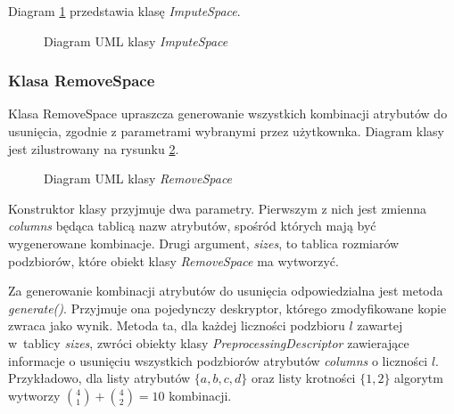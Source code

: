 \documentclass[../thesis.tex]{subfiles}
\begin{document}
Diagram \ref{proj:diagram_impute_space} przedstawia klasę \emph{ImputeSpace}.

\begin{figure}[h]
\centering
{}
\caption{Diagram UML klasy \emph{ImputeSpace}}
\label{proj:diagram_impute_space}
\end{figure}

\subsubsection{Klasa RemoveSpace}

Klasa RemoveSpace upraszcza generowanie wszystkich kombinacji atrybutów do usunięcia, zgodnie z parametrami wybranymi przez użytkownka. Diagram klasy jest zilustrowany na rysunku \ref{proj:diagram_remove_space}.

\begin{figure}[h]
\centering
{}
\caption{Diagram UML klasy \emph{RemoveSpace}}
\label{proj:diagram_remove_space}
\end{figure}

Konstruktor klasy przyjmuje dwa parametry. Pierwszym z nich jest zmienna \emph{columns} będąca tablicą nazw atrybutów, spośród których mają być wygenerowane kombinacje. Drugi argument, \emph{sizes}, to tablica rozmiarów podzbiorów, które obiekt klasy \emph{RemoveSpace} ma wytworzyć.

Za generowanie kombinacji atrybutów do usunięcia odpowiedzialna jest metoda \emph{generate()}. Przyjmuje ona pojedynczy deskryptor, którego zmodyfikowane kopie zwraca jako wynik. Metoda ta, dla każdej liczności podzbioru $l$ zawartej w~tablicy \emph{sizes}, zwróci obiekty klasy \emph{PreprocessingDescriptor} zawierające informacje o usunięciu wszystkich podzbiorów atrybutów \emph{columns} o liczności $l$. Przykładowo, dla listy atrybutów $\{a, b, c, d\}$ oraz listy krotności $\{1, 2\}$ algorytm wytworzy ${4 \choose 1} + {4 \choose 2} = 10$ kombinacji. 
\end{document}
